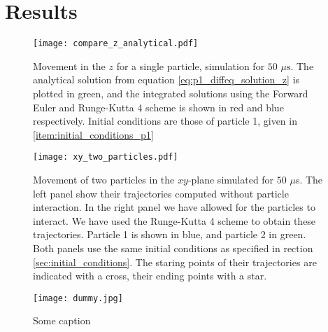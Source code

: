 \section{Results}\label{sec:results}



\begin{figure}[h!]
    \texttt{[image: compare\_z\_analytical.pdf]}
    \caption{Movement in the $z$ for a single particle, simulation for $50$ $\mu\mathrm{s}$. The analytical solution from equation \ref{eq:p1_diffeq_solution_z} is plotted in green, and the integrated solutions using the Forward Euler and Runge-Kutta 4 scheme is shown in red and blue respectively. Initial conditions are those of particle 1, given in \ref{item:initial_conditions_p1} }
    \label{fig:compare_z_analytical}
\end{figure}




\newpage
\onecolumngrid


\begin{figure}[h!]
    \texttt{[image: xy\_two\_particles.pdf]}
    \caption{Movement of two particles in the $xy$-plane simulated for $50$ $\mu$s. The left panel show their trajectories computed without particle interaction. In the right panel we have allowed for the particles to interact. We have used the Runge-Kutta 4 scheme to obtain these trajectories. Particle 1 is shown in blue, and particle 2 in green. Both panels use the same initial conditions as specified in rection \ref{sec:initial_conditions}. The staring points of their trajectories are indicated with a cross, their ending points with a star. }
    \label{fig:xy_two_particles}
\end{figure}

\begin{figure}[h!]
    \texttt{[image: dummy.jpg]}
    \caption{Some caption}
    \label{fig:some_ref}
\end{figure}


